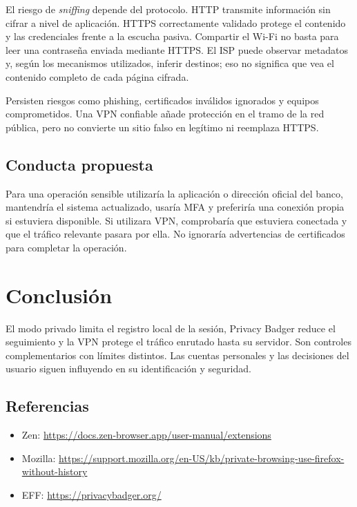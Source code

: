 \documentclass[11pt,a4paper]{article}
\begin{document}
El riesgo de \textit{sniffing} depende del protocolo. HTTP transmite información sin cifrar a nivel de aplicación. HTTPS correctamente validado protege el contenido y las credenciales frente a la escucha pasiva. Compartir el Wi-Fi no basta para leer una contraseña enviada mediante HTTPS. El ISP puede observar metadatos y, según los mecanismos utilizados, inferir destinos; eso no significa que vea el contenido completo de cada página cifrada.

Persisten riesgos como phishing, certificados inválidos ignorados y equipos comprometidos. Una VPN confiable añade protección en el tramo de la red pública, pero no convierte un sitio falso en legítimo ni reemplaza HTTPS.
\subsection{Conducta propuesta}
Para una operación sensible utilizaría la aplicación o dirección oficial del banco, mantendría el sistema actualizado, usaría MFA y preferiría una conexión propia si estuviera disponible. Si utilizara VPN, comprobaría que estuviera conectada y que el tráfico relevante pasara por ella. No ignoraría advertencias de certificados para completar la operación.
\section{Conclusión}
El modo privado limita el registro local de la sesión, Privacy Badger reduce el seguimiento y la VPN protege el tráfico enrutado hasta su servidor. Son controles complementarios con límites distintos. Las cuentas personales y las decisiones del usuario siguen influyendo en su identificación y seguridad.
\subsection{Referencias}
\small
\begin{itemize}
\item Zen: \url{https://docs.zen-browser.app/user-manual/extensions}
\item Mozilla: \url{https://support.mozilla.org/en-US/kb/private-browsing-use-firefox-without-history}
\item EFF: \url{https://privacybadger.org/}
\end{itemize}
\end{document}
